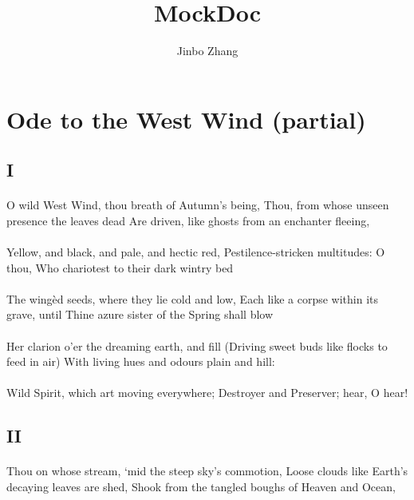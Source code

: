\documentclass{article}
\author{Jinbo Zhang}
\title{MockDoc}
\begin{document}
	\maketitle
	\section{Ode to the West Wind (partial)}
		\subsection{I}
			\paragraph{}
				O wild West Wind, thou breath of Autumn’s being,
				Thou, from whose unseen presence the leaves dead
				Are driven, like ghosts from an enchanter fleeing,
			\paragraph{}
				Yellow, and black, and pale, and hectic red,
				Pestilence-stricken multitudes: O thou,
				Who chariotest to their dark wintry bed
			\paragraph{}
				The wingèd seeds, where they lie cold and low,
				Each like a corpse within its grave, until
				Thine azure sister of the Spring shall blow
			\paragraph{}
				Her clarion o’er the dreaming earth, and fill
				(Driving sweet buds like flocks to feed in air)
				With living hues and odours plain and hill:
			\paragraph{}
				Wild Spirit, which art moving everywhere;
				Destroyer and Preserver; hear, O hear!
		\subsection{II}
			\paragraph{}
				Thou on whose stream, ‘mid the steep sky’s commotion,
				Loose clouds like Earth’s decaying leaves are shed,
				Shook from the tangled boughs of Heaven and Ocean,
\end{document}

